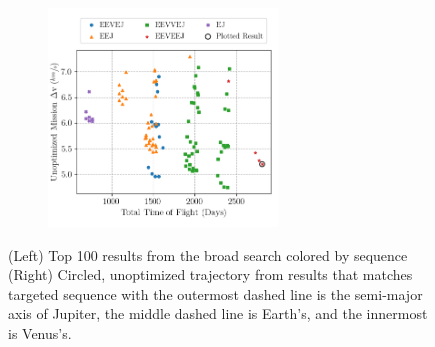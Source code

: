 \documentclass[letterpaper, preprint, paper,11pt]{AAS}	%
\begin{document}
\begin{figure}[!ht]
    \centering
    \begin{subfigure}
        \centering\includegraphics[width=2.4in]{./fig/clipperResults.png}
    \end{subfigure}
    \begin{subfigure}
        \centering
    \end{subfigure}
    \setlength{\belowcaptionskip}{-10pt}
    \caption{(Left) Top 100 results from the broad search colored by sequence\hspace{1em} (Right) Circled, unoptimized trajectory from results that matches targeted sequence \cite{Buffington2014} with the outermost dashed line is the semi-major axis of Jupiter, the middle dashed line is Earth's, and the innermost is Venus's.}
    \label{fig:clipResults}
\end{figure}
\end{document}
